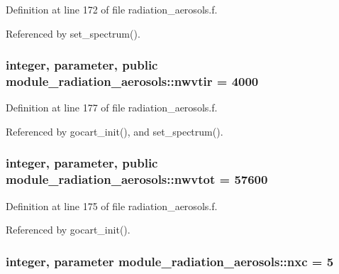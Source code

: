 Definition at line 172 of file radiation\+\_\+aerosols.\+f.



Referenced by set\+\_\+spectrum().

\subsubsection[{\texorpdfstring{nwvtir}{nwvtir}}]{\setlength{\rightskip}{0pt plus 5cm}integer, parameter, public module\+\_\+radiation\+\_\+aerosols\+::nwvtir = 4000}\hypertarget{namespacemodule__radiation__aerosols_a45b2c26ccba5d4fd2dfccf31bcc02824}{}\label{namespacemodule__radiation__aerosols_a45b2c26ccba5d4fd2dfccf31bcc02824}


Definition at line 177 of file radiation\+\_\+aerosols.\+f.



Referenced by gocart\+\_\+init(), and set\+\_\+spectrum().

\subsubsection[{\texorpdfstring{nwvtot}{nwvtot}}]{\setlength{\rightskip}{0pt plus 5cm}integer, parameter, public module\+\_\+radiation\+\_\+aerosols\+::nwvtot = 57600}\hypertarget{namespacemodule__radiation__aerosols_ae94df49c8ff8c0ec8e6b8adb891f3c6b}{}\label{namespacemodule__radiation__aerosols_ae94df49c8ff8c0ec8e6b8adb891f3c6b}


Definition at line 175 of file radiation\+\_\+aerosols.\+f.



Referenced by gocart\+\_\+init().

\subsubsection[{\texorpdfstring{nxc}{nxc}}]{\setlength{\rightskip}{0pt plus 5cm}integer, parameter module\+\_\+radiation\+\_\+aerosols\+::nxc = 5\hspace{0.3cm}{\ttfamily [private]}}\hypertarget{namespacemodule__radiation__aerosols_a1fffbb55ad2986a216b721a6c103c4cf}{}\label{namespacemodule__radiation__aerosols_a1fffbb55ad2986a216b721a6c103c4cf}


